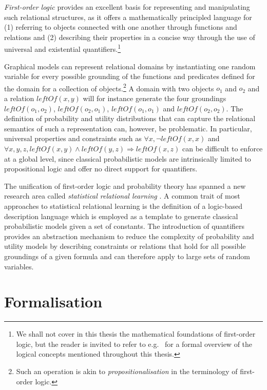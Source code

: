 \textit{First-order logic} provides an excellent basis for representing and manipulating such relational structures, as it offers a mathematically principled language for (1) referring to objects connected with one another through functions and relations and (2) describing their properties in a concise way through the use of universal and existential quantifiers.\footnote{We shall not cover in this thesis the mathematical foundations of first-order logic, but the reader is invited to refer to e.g.\ \cite{gamut1991logic} for a formal overview of the logical concepts mentioned throughout this thesis.}

Graphical models can represent relational domains by instantiating one random variable for every possible grounding of the functions and predicates defined for the domain for a collection of objects.\footnote{Such an operation is akin to \textit{propositionalisation} in the terminology of first-order logic.}  A domain with two objects $o_1$ and $o_2$ and a relation $\mathit{leftOf}(x,y)$ will for instance generate the four groundings $\mathit{leftOf}(o_1,o_2)$, $\mathit{leftOf}(o_2,o_1)$, $\mathit{leftOf}(o_1,o_1)$ and $\mathit{leftOf}(o_2,o_2)$. The definition of probability and utility distributions that can capture the relational semantics of such a representation can, however, be problematic. In particular, universal properties and constraints such as $\forall x, \neg \mathit{leftOf}(x,x)$ and $\forall x, y, z, \mathit{leftOf}(x,y) \land \mathit{leftOf}(y,z) \Rightarrow \mathit{leftOf}(x,z)$ can be difficult to enforce at a global level, since classical probabilistic models are intrinsically limited to propositional logic and offer no direct support for quantifiers. 
 
The unification of first-order logic and probability theory has spanned a new research area called \textit{statistical relational learning} \citep{getoor:srlbook07}. A common trait of most approaches to statistical relational learning is the definition of a logic-based description language which is employed as a template to generate classical probabilistic models given a set of constants. The introduction of quantifiers provides an abstraction mechanism to reduce the complexity of probability and utility models by describing constraints or relations that hold for all possible groundings of a given formula and can therefore apply to large sets of random variables. 

\section{Formalisation}
\label{sec:formalisation}

